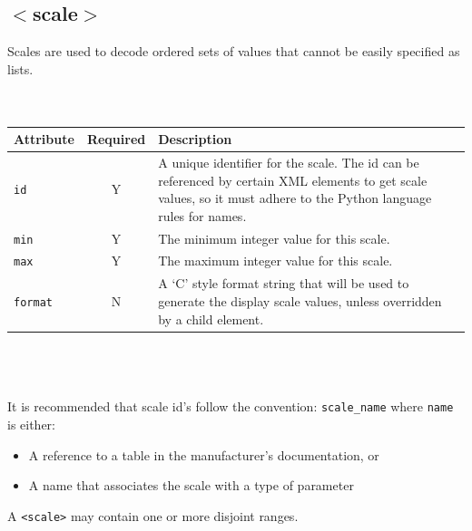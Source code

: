\documentclass[a4paper,twoside,12pt]{article}
\newcommand{\code}[1]{\color{red}\texttt{#1}\color{black}}
\begin{document}
\subsection{$<$scale$>$}
Scales are used to decode ordered sets of values that cannot be
easily specified as lists.
\\
\\
\\
\begin{tabular}{|l|c|p{9cm}|}
\hline
Attribute & Required & Description \\
\hline \code{id} & Y & A unique identifier for the scale. The id
can be referenced by certain XML elements to get scale values, so
it must adhere to the Python language rules for names. \\
\code{min} & Y & The minimum integer value for this scale. \\
\code{max} & Y & The maximum integer value for this scale. \\
\code{format} & N & A `C' style format string that will be used to
generate the display scale values, unless overridden by a child element. \\
\hline
\end{tabular}
\\
\\
\\
It is recommended that scale id's follow the convention:
     \code{scale\_name}{} where \code{name}{} is either:
\begin{itemize}
\item A reference to a table in the manufacturer's documentation,
or \item A name that associates the scale with a type of parameter
\end{itemize}

A \code{<scale>}{} may contain one or more disjoint ranges.
\end{document}
